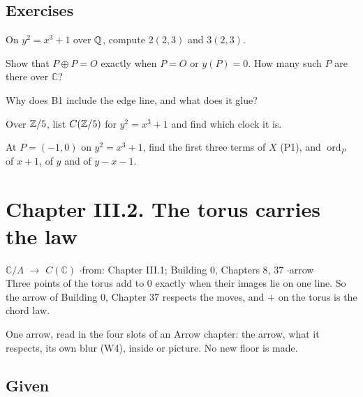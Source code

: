 \subsection*{Exercises}

\begin{lines}
\item[\lab{E1}] On $y^2 = x^3 + 1$ over $\mathbb{Q}$, compute $2(2, 3)$ and $3(2, 3)$.
\item[\lab{E2}] Show that $P \oplus P = O$ exactly when $P = O$ or $y(P) = 0$. How many such $P$ are there over $\mathbb{C}$?
\item[\lab{E3}] Why does B1 include the edge line, and what does it glue?
\item[\lab{E4}] Over $\mathbb{Z}/5$, list $C(\mathbb{Z}/5)$ for $y^2 = x^3 + 1$ and find which clock it is.
\item[\lab{E5}] At $P = (-1, 0)$ on $y^2 = x^3 + 1$, find the first three terms of $X$ (P1), and $\operatorname{ord}_P$ of $x + 1$, of $y$ and of $y - x - 1$.
\end{lines}

\newpage

\section*{Chapter III.2. The torus carries the law}
\begin{center}
{\normalsize $\mathbb{C}/\Lambda$ $\to$ $C(\mathbb{C})$ \quad$\cdot$\quad from: Chapter III.1; Building 0, Chapters 8, 37 \quad$\cdot$\quad arrow}\\[4pt]
{\small Three points of the torus add to $0$ exactly when their images lie on one line. So the arrow of Building 0, Chapter 37 respects the moves, and $+$ on the torus is the chord law.}
\end{center}

One arrow, read in the four slots of an Arrow chapter: the arrow, what it respects, its own blur (W4), inside or picture. No new floor is made.

\subsection*{Given}

